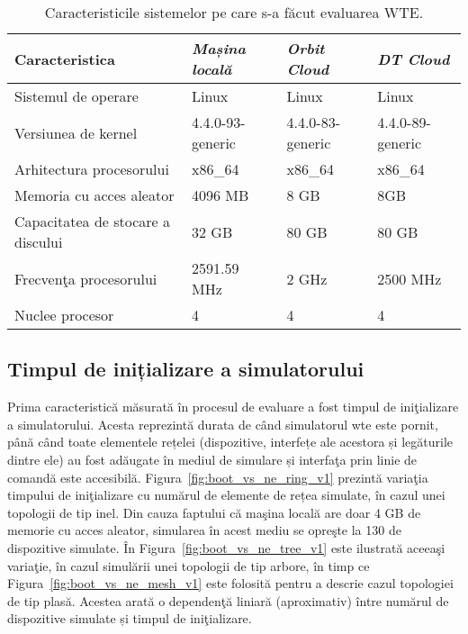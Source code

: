 \begin{table}[h]
	
	\caption{Caracteristicile sistemelor pe care s-a făcut evaluarea WTE.\label{tab:resources}}
	\begin{tabular}{|M{0.25\textwidth}|M{0.2\textwidth}|M{0.2\textwidth}|M{0.2\textwidth}|}
		\hline
		\textbf{Caracteristica} & \textbf{\emph{Mașina locală}} & \textbf{\emph{Orbit Cloud}} & \textbf{\emph{DT Cloud}} \tabularnewline
		\hline 
		Sistemul de operare & Linux & Linux & Linux \tabularnewline
		\hline 
		Versiunea de kernel & 4.4.0-93-generic & 4.4.0-83-generic & 4.4.0-89-generic
		\tabularnewline
		\hline 
		Arhitectura procesorului & x86\_64 & x86\_64 & x86\_64 \tabularnewline
		\hline 
		Memoria cu acces aleator & 4096 MB & 8 GB & 8GB \tabularnewline
		\hline 
		Capacitatea de stocare a discului & 32 GB & 80 GB & 80 GB \tabularnewline
		\hline 
		Frecvenţa procesorului & 2591.59 MHz & 2 GHz & 2500 MHz \tabularnewline
		\hline 
		Nuclee procesor & 4 & 4 & 4 \tabularnewline
		\hline \end{tabular}
\end{table}


\subsection{Timpul de inițializare a simulatorului}

Prima caracteristică măsurată în procesul de evaluare a fost timpul de iniţializare a simulatorului. Acesta reprezintă durata de când simulatorul \gls{wte} este pornit, până când toate elementele rețelei (dispozitive, interfețe ale acestora și legăturile dintre ele) au fost adăugate în mediul de simulare și interfaţa prin linie de comandă este accesibilă. Figura~\ref{fig:boot_vs_ne_ring_v1} prezintă variaţia timpului de iniţializare cu numărul de elemente de rețea simulate, în cazul unei topologii de tip inel. Din cauza faptului că maşina locală are doar 4 GB de memorie cu acces aleator, simularea în acest mediu se opreşte la 130 de dispozitive simulate. În Figura~\ref{fig:boot_vs_ne_tree_v1} este ilustrată aceeaşi variaţie, în cazul simulării unei topologii de tip arbore, în timp ce Figura~\ref{fig:boot_vs_ne_mesh_v1} este folosită pentru a descrie cazul topologiei de tip plasă. Acestea arată o dependenţă liniară (aproximativ) între numărul de dispozitive simulate și timpul de iniţializare. 

